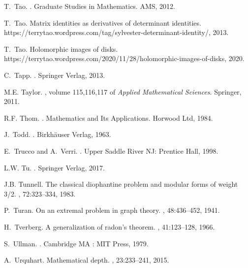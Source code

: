 \documentclass[12pt]{amsart}
\begin{document}
\begin{thebibliography}{100}
T.~Tao.
.
\newblock Graduate Studies in Mathematics. AMS, 2012.

T.~Tao.
\newblock Matrix identities as derivatives of determinant identities.
\newblock https://terrytao.wordpress.com/tag/sylvester-determinant-identity/,
  2013.

T.~Tao.
\newblock Holomorphic images of disks.
\newblock
  https://terrytao.wordpress.com/2020/11/28/holomorphic-images-of-disks, 2020.

C.~Tapp.
.
\newblock Springer Verlag, 2013.

M.E. Taylor.
, volume 115,116,117 of
  {\em Applied Mathematical Sciences}.
\newblock Springer, 2011.

R.F. Thom.
.
\newblock Mathematics and Its Applications. Horwood Ltd, 1984.

J.~Todd.
.
\newblock Birkh{\"a}user Verlag, 1963.

E.~Trucco and A.~Verri.
.
\newblock Upper Saddle River NJ: Prentice Hall, 1998.

L.W. Tu.
.
\newblock Springer Verlag, 2017.

J.B. Tunnell.
\newblock The classical diophantine problem and modular forms of weight 3/2.
, 72:323--334, 1983.

P.~Turan.
\newblock On an extremal problem in graph theory.
, 48:436--452, 1941.

H.~Tverberg.
\newblock A generalization of radon's theorem.
, 41:123--128, 1966.

S.~Ullman.
.
\newblock Cambridge MA : MIT Press, 1979.

A.~Urquhart.
\newblock Mathematical depth.
, 23:233--241, 2015.


\end{thebibliography}
\end{document}
